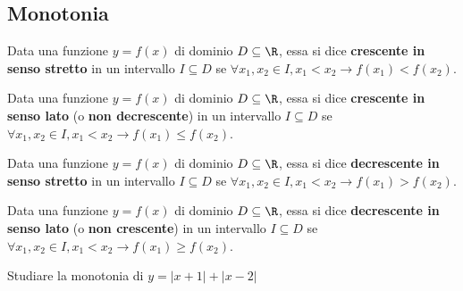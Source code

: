 \documentclass{article}     %
\begin{document}
    \subsection{Monotonia}
        \begin{boxdef}
            Data una funzione $y=f(x)$ di dominio $D\subseteq \R$, essa si dice \textbf{crescente in senso stretto} in un intervallo $I\subseteq D$ se $\forall x_1,x_2 \in I, x_1 <x_2 \rightarrow f(x_1)<f(x_2)$.
        \end{boxdef}
        \begin{boxdef}
            Data una funzione $y=f(x)$ di dominio $D\subseteq \R$, essa si dice \textbf{crescente in senso lato} (o \textbf{non decrescente}) in un intervallo $I\subseteq D$ se $\forall x_1,x_2 \in I, x_1 <x_2 \rightarrow f(x_1)\leq f(x_2)$.
        \end{boxdef}
        \begin{boxdef}
            Data una funzione $y=f(x)$ di dominio $D\subseteq \R$, essa si dice \textbf{decrescente in senso stretto} in un intervallo $I\subseteq D$ se $\forall x_1,x_2 \in I, x_1 <x_2 \rightarrow f(x_1)>f(x_2)$.
        \end{boxdef}
        \begin{boxdef}
            Data una funzione $y=f(x)$ di dominio $D\subseteq \R$, essa si dice \textbf{decrescente in senso lato} (o \textbf{non crescente}) in un intervallo $I\subseteq D$ se $\forall x_1,x_2 \in I, x_1 <x_2 \rightarrow f(x_1)\geq f(x_2)$. 
        \end{boxdef}
        \begin{ex}
            Studiare la monotonia di $y=|x+1|+|x-2|$
        \end{ex}
        \begin{wrapfigure}[9]{r}{0.40\textwidth}
            \begin{center}
            \end{center}
        \end{wrapfigure}
\end{document}
